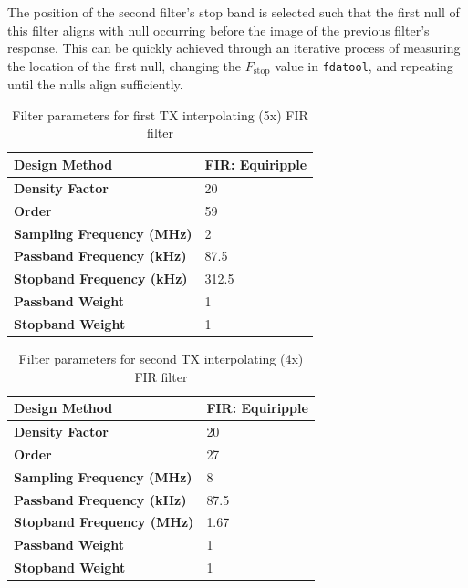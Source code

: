 The position of the second filter's stop band is selected such that the first
null of this filter aligns with null occurring before the image of the previous
filter's response. This can be quickly achieved through an iterative process of
measuring the location of the first null, changing the $F_{\text{stop}}$ value
in \texttt{fdatool}, and repeating until the nulls align sufficiently.

\begin{table}[h]
  \centering
  \caption{Filter parameters for first TX interpolating (5x) FIR filter}
  \label{tab:tx_interp_fir1}
  \footnotesize
  \begin{tabular} {|l|l|}
    \hline
    \textbf{Design Method}              & FIR: Equiripple \\ \hline
    \textbf{Density Factor}             & 20              \\ \hline
    \textbf{Order}                      & 59              \\ \hline
    \textbf{Sampling Frequency (MHz)}   & 2               \\ \hline
    \textbf{Passband Frequency (kHz)}   & 87.5            \\ \hline
    \textbf{Stopband Frequency (kHz)}   & 312.5           \\ \hline
    \textbf{Passband Weight}            & 1               \\ \hline
    \textbf{Stopband Weight}            & 1               \\ \hline
  \end{tabular}
\end{table}

\begin{table}[h]
  \centering
  \caption{Filter parameters for second TX interpolating (4x) FIR filter}
  \label{tab:tx_interp_fir2}
  \footnotesize
  \begin{tabular} {|l|l|}
    \hline
    \textbf{Design Method}              & FIR: Equiripple \\ \hline
    \textbf{Density Factor}             & 20              \\ \hline
    \textbf{Order}                      & 27              \\ \hline
    \textbf{Sampling Frequency (MHz)}   & 8               \\ \hline
    \textbf{Passband Frequency (kHz)}   & 87.5            \\ \hline
    \textbf{Stopband Frequency (MHz)}   & 1.67            \\ \hline
    \textbf{Passband Weight}            & 1               \\ \hline
    \textbf{Stopband Weight}            & 1               \\ \hline
  \end{tabular}
\end{table}

